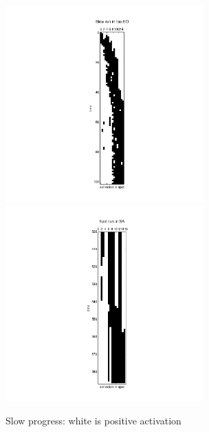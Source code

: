\documentclass[12pt]{article}
\begin{document}
\begin{figure}
  \label{fig:slow_progess}
  \includegraphics[width=3in]{eo_slow}
  \includegraphics[width=3in]{sa_slow}
  \caption{Slow progress: white is positive activation}
\end{figure}
\end{document}
